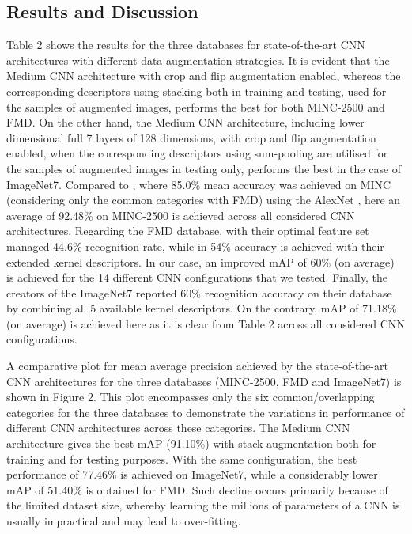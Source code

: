 \documentclass[a4paper,twoside]{article}
\begin{document}
\subsection{Results and Discussion}
\noindent Table 2 shows the results for the three databases for state-of-the-art CNN architectures with different data augmentation strategies. It is evident that the Medium CNN architecture with crop and flip augmentation enabled, whereas the corresponding descriptors using stacking both in training and testing, used for the samples of augmented images, performs the best for both MINC-2500 and FMD. On the other hand, the Medium CNN architecture, including lower dimensional full 7 layers of 128 dimensions, with crop and flip augmentation enabled, when the corresponding descriptors using sum-pooling are utilised for the samples of augmented images in testing only, performs the best in the case of ImageNet7. Compared to \cite{8}, where 85.0\% mean accuracy was achieved on MINC (considering only the common categories with FMD) using the AlexNet \cite{3}, here an average of 92.48\% on MINC-2500 is achieved across all considered CNN architectures. Regarding the FMD database, \cite{14} with their optimal feature set managed 44.6\% recognition rate, while in \cite{29} 54\% accuracy is achieved with their extended kernel descriptors. In our case, an improved mAP of 60\% (on average) is achieved for the 14 different CNN configurations that we tested. Finally, the creators of the ImageNet7 \cite{15} reported 60\% recognition accuracy on their database by combining all 5 available kernel descriptors. On the contrary, mAP of 71.18\% (on average) is achieved here as it is clear from Table 2 across all considered CNN configurations.

A comparative plot for mean average precision achieved by the state-of-the-art CNN architectures for the three databases (MINC-2500, FMD and ImageNet7) is shown in Figure 2. This plot encompasses only the six common/overlapping categories for the three databases to demonstrate the variations in performance of different CNN architectures across these categories. The Medium CNN architecture gives the best mAP (91.10\%) with stack augmentation both for training and for testing purposes. With the same configuration, the best performance of 77.46\% is achieved on ImageNet7, while a considerably lower mAP of 51.40\% is obtained for FMD. Such decline occurs primarily because of the limited dataset size, whereby learning the millions of parameters of a CNN is usually impractical and may lead to over-fitting.
\end{document}
